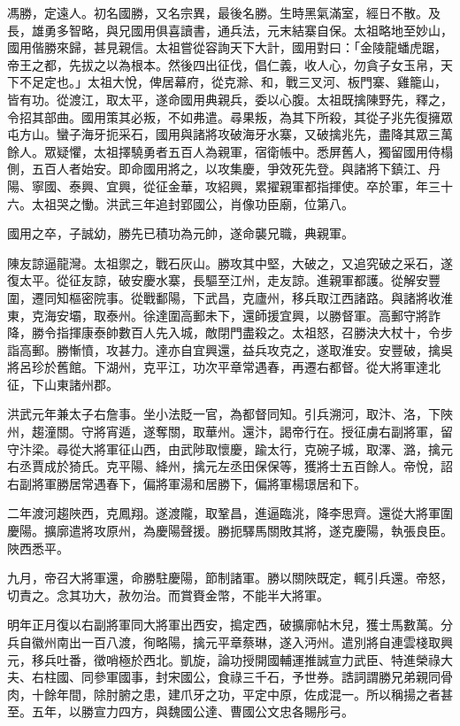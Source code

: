 
\begin{pinyinscope}
馮勝，定遠人。初名國勝，又名宗異，最後名勝。生時黑氣滿室，經日不散。及長，雄勇多智略，與兄國用俱喜讀書，通兵法，元末結寨自保。太祖略地至妙山，國用偕勝來歸，甚見親信。太祖嘗從容詢天下大計，國用對曰：「金陵龍蟠虎踞，帝王之都，先拔之以為根本。然後四出征伐，倡仁義，收人心，勿貪子女玉帛，天下不足定也。」太祖大悅，俾居幕府，從克滁、和，戰三叉河、板門寨、雞籠山，皆有功。從渡江，取太平，遂命國用典親兵，委以心腹。太祖既擒陳野先，釋之，令招其部曲。國用策其必叛，不如弗遣。尋果叛，為其下所殺，其從子兆先復擁眾屯方山。蠻子海牙扼采石，國用與諸將攻破海牙水寨，又破擒兆先，盡降其眾三萬餘人。眾疑懼，太祖擇驍勇者五百人為親軍，宿衛帳中。悉屏舊人，獨留國用侍榻側，五百人者始安。即命國用將之，以攻集慶，爭效死先登。與諸將下鎮江、丹陽、寧國、泰興、宜興，從征金華，攻紹興，累擢親軍都指揮使。卒於軍，年三十六。太祖哭之慟。洪武三年追封郢國公，肖像功臣廟，位第八。

國用之卒，子誠幼，勝先已積功為元帥，遂命襲兄職，典親軍。

陳友諒逼龍灣。太祖禦之，戰石灰山。勝攻其中堅，大破之，又追究破之采石，遂復太平。從征友諒，破安慶水寨，長驅至江州，走友諒。進親軍都護。從解安豐圍，遷同知樞密院事。從戰鄱陽，下武昌，克廬州，移兵取江西諸路。與諸將收淮東，克海安壩，取泰州。徐達圍高郵未下，還師援宜興，以勝督軍。高郵守將詐降，勝令指揮康泰帥數百人先入城，敵閉門盡殺之。太祖怒，召勝決大杖十，令步詣高郵。勝慚憤，攻甚力。達亦自宜興還，益兵攻克之，遂取淮安。安豐破，擒吳將呂珍於舊館。下湖州，克平江，功次平章常遇春，再遷右都督。從大將軍達北征，下山東諸州郡。

洪武元年兼太子右詹事。坐小法貶一官，為都督同知。引兵溯河，取汴、洛，下陜州，趨潼關。守將宵遁，遂奪關，取華州。還汴，謁帝行在。授征虜右副將軍，留守汴梁。尋從大將軍征山西，由武陟取懷慶，踰太行，克碗子城，取澤、潞，擒元右丞賈成於猗氏。克平陽、絳州，擒元左丞田保保等，獲將士五百餘人。帝悅，詔右副將軍勝居常遇春下，偏將軍湯和居勝下，偏將軍楊璟居和下。

二年渡河趨陜西，克鳳翔。遂渡隴，取鞏昌，進逼臨洮，降李思齊。還從大將軍圍慶陽。擴廓遣將攻原州，為慶陽聲援。勝扼驛馬關敗其將，遂克慶陽，執張良臣。陜西悉平。

九月，帝召大將軍還，命勝駐慶陽，節制諸軍。勝以關陜既定，輒引兵還。帝怒，切責之。念其功大，赦勿治。而賞賚金幣，不能半大將軍。

明年正月復以右副將軍同大將軍出西安，搗定西，破擴廓帖木兒，獲士馬數萬。分兵自徽州南出一百八渡，徇略陽，擒元平章蔡琳，遂入沔州。遣別將自連雲棧取興元，移兵吐番，徵哨極於西北。凱旋，論功授開國輔運推誠宣力武臣、特進榮祿大夫、右柱國、同參軍國事，封宋國公，食祿三千石，予世券。誥詞謂勝兄弟親同骨肉，十餘年間，除肘腑之患，建爪牙之功，平定中原，佐成混一。所以稱揚之者甚至。五年，以勝宣力四方，與魏國公達、曹國公文忠各賜彤弓。


\end{pinyinscope}
